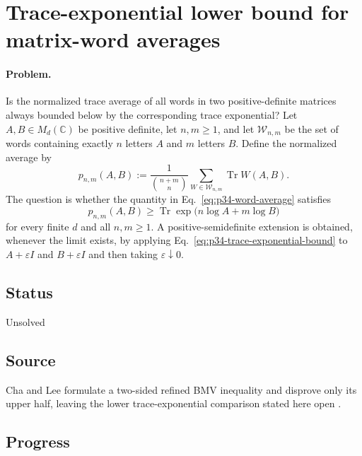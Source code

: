 \section{Trace-exponential lower bound for matrix-word averages}
\label{sec:problem-34}

\paragraph{Problem.}
Is the normalized trace average of all words in two positive-definite matrices
always bounded below by the corresponding trace exponential?  Let
$A,B\in M_d(\mathbb C)$ be positive definite, let $n,m\geq1$, and let
$\mathcal W_{n,m}$ be the set of words containing exactly $n$ letters $A$ and
$m$ letters $B$.  Define the normalized average by
\begin{equation}
  p_{n,m}(A,B)
  :=\frac{1}{\binom{n+m}{n}}
    \sum_{W\in\mathcal W_{n,m}}\operatorname{Tr}W(A,B).
  \label{eq:p34-word-average}
\end{equation}
The question is whether the quantity in Eq.~\eqref{eq:p34-word-average}
satisfies
\begin{equation}
  p_{n,m}(A,B)
  \geq \operatorname{Tr}\exp\!\bigl(n\log A+m\log B\bigr)
  \label{eq:p34-trace-exponential-bound}
\end{equation}
for every finite $d$ and all $n,m\geq1$.  A positive-semidefinite extension
is obtained, whenever the limit exists, by applying
Eq.~\eqref{eq:p34-trace-exponential-bound} to $A+\varepsilon I$ and
$B+\varepsilon I$ and then taking $\varepsilon\downarrow0$.

\subsection*{Status}

Unsolved

\subsection*{Source}

Cha and Lee formulate a two-sided refined BMV inequality and disprove only
its upper half, leaving the lower trace-exponential comparison stated here
open .

\subsection*{Progress}


